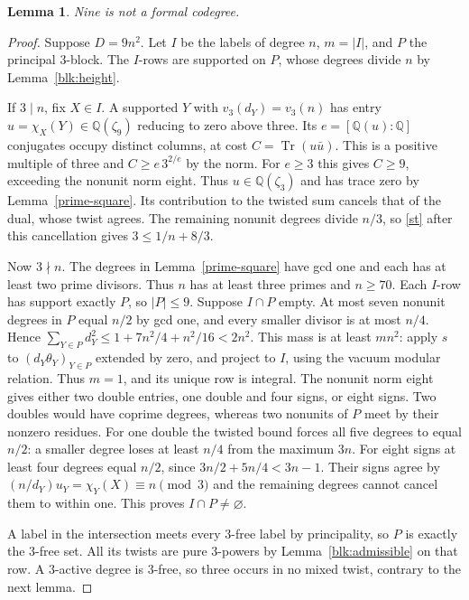 \documentclass[11pt]{amsart}
\numberwithin{equation}{section}
\newtheorem{lemma}[theorem]{Lemma}
\DeclareMathOperator{\Tr}{Tr}
\newcommand{\QQ}{\mathbb Q}
\begin{document}
\begin{lemma}\label{nine}
Nine is not a formal codegree.
\end{lemma}
\begin{proof}
Suppose $D=9n^2$. Let $I$ be the labels of degree $n$, $m=|I|$, and
$P$ the principal $3$-block. The $I$-rows are supported on $P$,
whose degrees divide $n$ by Lemma~\ref{blk:height}.

If $3\mid n$, fix $X\in I$. A supported $Y$ with $v_3(d_Y)=v_3(n)$
has entry $u=\chi_X(Y)\in\QQ(\zeta_9)$ reducing to zero above three.
Its $e=[\QQ(u):\QQ]$ conjugates occupy distinct columns, at cost
$C=\Tr(u\bar u)$. This is a positive multiple of three and
$C\ge e\,3^{2/e}$ by the norm. For $e\ge3$ this gives $C\ge9$,
exceeding the nonunit norm eight. Thus $u\in\QQ(\zeta_3)$ and has
trace zero by Lemma~\ref{prime-square}. Its contribution to the twisted
sum cancels that of the dual, whose twist agrees. The remaining nonunit
degrees divide $n/3$, so \eqref{st} after this cancellation gives
$3\le1/n+8/3$.

Now $3\nmid n$. The degrees in Lemma~\ref{prime-square} have gcd one and
each has at least two prime divisors. Thus $n$ has at least three primes
and $n\ge70$. Each $I$-row has support exactly $P$, so $|P|\le9$.
Suppose $I\cap P$ empty. At most seven nonunit degrees in $P$ equal
$n/2$ by gcd one, and every smaller divisor is at most $n/4$. Hence
$\sum_{Y\in P}d_Y^2\le1+7n^2/4+n^2/16<2n^2$. This mass is at least
$mn^2$: apply $s$ to $(d_Y\theta_Y)_{Y\in P}$ extended by zero, and
project to $I$, using the vacuum modular relation. Thus $m=1$, and its
unique row is integral. The nonunit norm eight gives either two double
entries, one double and four signs, or eight signs. Two doubles would
have coprime degrees, whereas two nonunits of $P$ meet by their
nonzero residues. For one double the twisted bound forces all five
degrees to equal $n/2$: a smaller degree loses at least $n/4$ from the
maximum $3n$. For eight signs at least four degrees equal $n/2$, since
$3n/2+5n/4<3n-1$. Their signs agree by
$(n/d_Y)u_Y=\chi_Y(X)\equiv n\pmod3$ and the remaining degrees cannot
cancel them to within one. This proves $I\cap P\ne\varnothing$.

A label in the intersection meets every $3$-free label by principality,
so $P$ is exactly the $3$-free set. All its twists are pure $3$-powers
by Lemma~\ref{blk:admissible} on that row. A $3$-active degree is
$3$-free, so three occurs in no mixed twist, contrary to the next lemma.
\end{proof}
\end{document}
